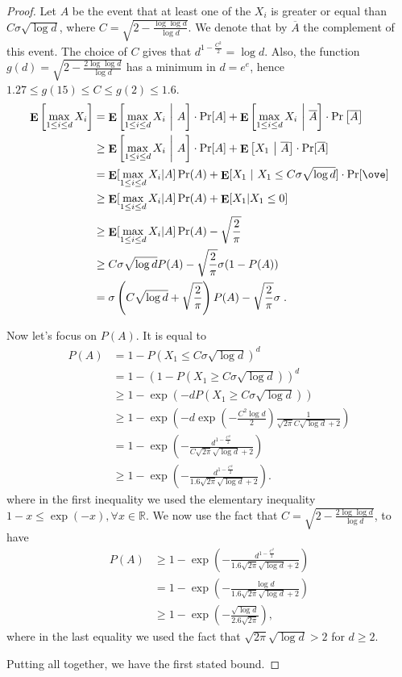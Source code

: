 \documentclass{article}
\DeclareMathOperator*{\Exp}{\mathbf{E}}
\newcommand{\field}[1]{\mathbb{#1}}
\newcommand{\R}{\field{R}}
\begin{document}
\begin{proof}

Let $A$ be the event that at least one of the $X_i$ is greater or equal than $C
\sigma \sqrt{\log d}$, where $C=\sqrt{2-\frac{\log \log d}{\log d}}$. We denote that by $\overline{A}$
the complement of this event. The choice of $C$ gives that $d^{1-\frac{C^2}{2}}=\log d$.
Also, the function $g(d)=\sqrt{2-\frac{2\log \log d}{\log d}}$ has a minimum in $d=e^e$, hence
$1.27 \leq g(15) \leq C\leq g(2)\leq 1.6$.
%
\begin{align*}
\Exp \left[ \max_{1 \le i \le d} X_i \right]
&= \Exp \left[ \max_{1 \le i \le d} X_i ~\bigg|~ A \right] \cdot \Pr[A] + \Exp \left[ \max_{1 \le i \le d} X_i ~\bigg|~ \overline{A} \right] \cdot \Pr \left[ \overline{A} \right] \\
&\ge \Exp \left[ \max_{1 \le i \le d} X_i ~\bigg|~ A \right] \cdot \Pr[A] + \Exp \left[ X_1 ~\big|~ \overline{A} \right] \cdot \Pr[\overline{A}] \\
&= \Exp[\max_{1 \le i \le d} X_i| A ] \Pr(A) + \Exp[X_1~|~ X_1 \le C \sigma \sqrt{\log d}] \cdot \Pr[\ove] \\
&\ge \Exp[\max_{1 \le i \le d} X_i| A ] \Pr(A) + \Exp[X_1| X_1 \le 0] \\
&\ge \Exp[\max_{1 \le i \le d} X_i| A ] \Pr(A) - \sqrt{\frac{2}{\pi}} \\
&\ge C \sigma \sqrt{\log d} P(A) - \sqrt{\frac{2}{\pi}} \sigma (1-P(A))\\
&= \sigma \left(C\sqrt{\log d} +\sqrt{\frac{2}{\pi}}\right)P(A) -  \sqrt{\frac{2}{\pi}} \sigma \; .
\end{align*}

Now let's focus on $P(A)$. It is equal to
\begin{align*}
P(A)
&= 1-P(X_1\leq C \sigma \sqrt{\log d})^d \\
&= 1-(1-P(X_1\geq C \sigma \sqrt{\log d}))^d \\
&\geq 1-\exp\left(-d P(X_1\geq C \sigma \sqrt{\log d})\right) \\
&\geq 1 - \exp\left(-d \exp\left(-\frac{C^2 \log d}{2}\right) \frac{1}{\sqrt{2\pi}C \sqrt{\log d}+2} \right) \\
&= 1 - \exp\left(-\frac{d^{1-\frac{C^2}{2}}}{C \sqrt{2\pi} \sqrt{\log d}+2}\right) \\
&\geq 1 - \exp\left(-\frac{d^{1-\frac{C^2}{2}}}{1.6 \sqrt{2\pi} \sqrt{\log d}+2}\right).
\end{align*}
where in the first inequality we used the elementary inequality $1-x \leq \exp(-x), \forall x \in \R$.
We now use the fact that $C=\sqrt{2- \frac{2 \log \log d}{\log d}}$, to have
\begin{align*}
P(A)
& \geq 1 - \exp\left(-\frac{d^{1-\frac{C^2}{2}}}{1.6 \sqrt{2\pi} \sqrt{\log d}+2}\right) \\
& = 1 - \exp\left(-\frac{\log d}{1.6 \sqrt{2\pi} \sqrt{\log d}+2}\right) \\
& \geq 1 - \exp\left(-\frac{\sqrt{\log d}}{2.6 \sqrt{2\pi}}\right),
\end{align*}
where in the last equality we used the fact that $\sqrt{2\pi} \sqrt{\log d} > 2$ for $d\geq 2$.

Putting all together, we have the first stated bound.
\end{proof}
\end{document}
